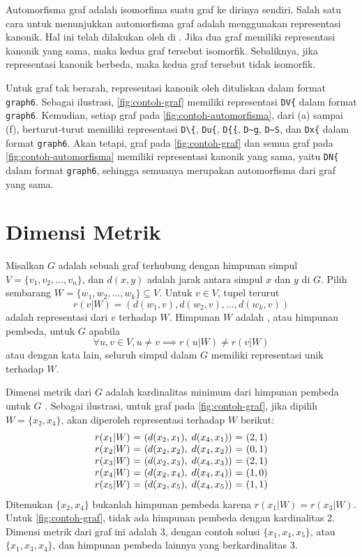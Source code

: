 Automorfisma graf adalah isomorfima suatu graf ke dirinya sendiri. Salah satu cara untuk menunjukkan automorfisma graf adalah menggunakan representasi kanonik. Hal ini telah dilakukan oleh \citeauthor{mckay2014} di \citeyear{mckay2014}. Jika dua graf memiliki representasi kanonik yang sama, maka kedua graf tersebut isomorfik. Sebaliknya, jika representasi kanonik berbeda, maka kedua graf tersebut tidak isomorfik.

Untuk graf tak berarah, representasi kanonik oleh \citeauthor{mckay2014} dituliskan dalam format \verb`graph6`. Sebagai ilustrasi, \autoref{fig:contoh-graf} memiliki representasi \verb`DV{` dalam format \verb`graph6`. Kemudian, setiap graf pada \autoref{fig:contoh-automorfisma}, dari (a) sampai (f), berturut-turut memiliki representasi \verb`D\{`, \verb`Du{`,  \verb`D{{`,  \verb`D~g`,  \verb`D~S`,  dan \verb`Dx{` dalam format \verb`graph6`. Akan tetapi, graf pada \autoref{fig:contoh-graf} dan semua graf pada \autoref{fig:contoh-automorfisma} memiliki representasi kanonik yang sama, yaitu \verb`DN{` dalam format \verb`graph6`, sehingga semuanya merupakan automorfisma dari graf yang sama.

\section{Dimensi Metrik}

Misalkan \(G\) adalah sebuah graf terhubung dengan himpunan simpul \(V = \{v_1, v_2, \ldots, v_n\}\), dan \(d(x, y)\) adalah jarak antara simpul \(x\) dan \(y\) di \(G\). Pilih sembarang \(W = \{w_1, w_2, \ldots, w_k\} \subseteq V\). Untuk \(v \in V\), tupel terurut
	\[ r(v|W) = (d(w_1, v), d(w_2, v), \ldots, d(w_k, v)) \]
adalah representasi dari \(v\) terhadap \(W\). Himpunan \(W\) adalah , atau himpunan pembeda, untuk \(G\) apabila
	\[ \forall u, v \in V, u \neq v \implies r(u|W) \neq r(v|W) \]
atau dengan kata lain, seluruh simpul dalam \(G\) memiliki representasi unik terhadap \(W\).

Dimensi metrik dari \(G\) adalah kardinalitas minimum dari himpunan pembeda untuk \(G\) \citep{tillquist2023}. Sebagai ilustrasi, untuk graf pada \autoref{fig:contoh-graf}, jika dipilih \(W = \{x_2, x_4\}\), akan diperoleh representasi terhadap \(W\) berikut:
\[
\begin{array}{c@{\ }c@{\ }c@{\ }c@{\ }c}
	r(x_1|W) & = & ( d(x_2, x_1), \; d(x_4, x_1) ) & = & (2, 1) \\
	r(x_2|W) & = & ( d(x_2, x_2), \; d(x_4, x_2) ) & = & (0, 1) \\
	r(x_3|W) & = & ( d(x_2, x_3), \; d(x_4, x_3) ) & = & (2, 1) \\
	r(x_4|W) & = & ( d(x_2, x_4), \; d(x_4, x_4) ) & = & (1, 0) \\
	r(x_5|W) & = & ( d(x_2, x_5), \; d(x_4, x_5) ) & = & (1, 1)
\end{array}
\]
Ditemukan \(\{x_2, x_4\}\) bukanlah himpunan pembeda karena \(r(x_1|W) = r(x_3|W)\). Untuk \autoref{fig:contoh-graf}, tidak ada himpunan pembeda dengan kardinalitas 2. Dimensi metrik dari graf ini adalah 3, dengan contoh solusi \(\{x_1, x_4, x_5\}\), atau \(\{x_1, x_3, x_4\}\), dan himpunan pembeda lainnya yang berkardinalitas 3.

